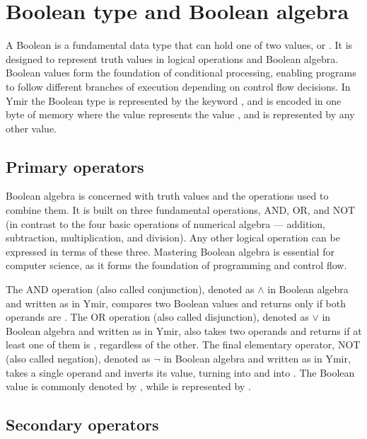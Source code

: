 \vfill\pagebreak
\section{Boolean type and Boolean algebra}

A Boolean is a fundamental data type that can hold one of two values,
 or . It is designed to represent truth values in
logical operations and Boolean algebra. Boolean values form the foundation of
conditional processing, enabling programs to follow different branches of
execution depending on control flow decisions. In Ymir the Boolean type is
represented by the keyword , and is encoded in one byte of memory
where the value  represents the value , and
 is represented by any other value.

\subsection{Primary operators}

Boolean algebra is concerned with truth values and the operations used to
combine them. It is built on three fundamental operations, AND, OR, and NOT (in
contrast to the four basic operations of numerical algebra — addition,
subtraction, multiplication, and division). Any other logical operation can be
expressed in terms of these three. Mastering Boolean algebra is essential for
computer science, as it forms the foundation of programming and control flow.

The AND operation (also called conjunction), denoted as $\land$ in Boolean
algebra and written as \token{&&} in Ymir, compares two Boolean values and
returns  only if both operands are . The OR operation
(also called disjunction), denoted as $\lor$ in Boolean algebra and written as
\token{||} in Ymir, also takes two operands and returns  if at least
one of them is , regardless of the other. The final elementary
operator, NOT (also called negation), denoted as $\lnot$ in Boolean algebra and
written as \token{!} in Ymir, takes a single operand and inverts its value,
turning  into  and  into . The
Boolean value  is commonly denoted by \bot, while  is
represented by \top.


\vspace{-10pt}%
\subsection{Secondary operators}


